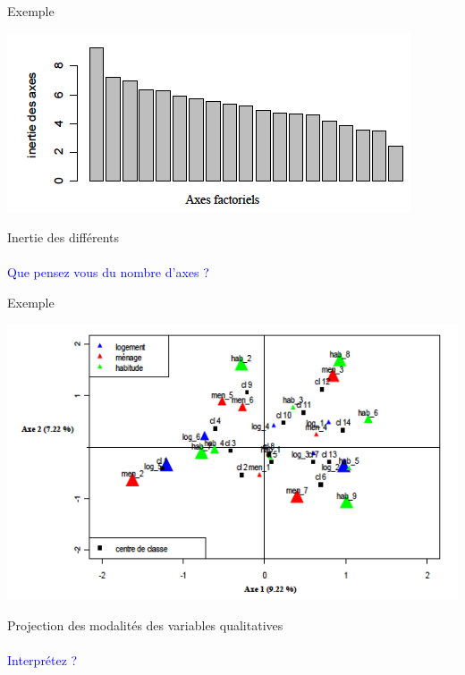 \documentclass[10pt]{beamer}
\begin{document}
\begin{frame}{Exemple}

 \includegraphics[scale=.5]{ACM2} 
 
 \centering Inertie des différents\\~\\

\textcolor{blue}{Que pensez vous du nombre d'axes ?}

\end{frame}

\begin{frame}{Exemple}

 \includegraphics[scale=.5]{ACM3} 

\centering Projection des modalités des variables qualitatives \\~\\

\textcolor{blue}{Interprétez ?}

\end{frame}
\end{document}
